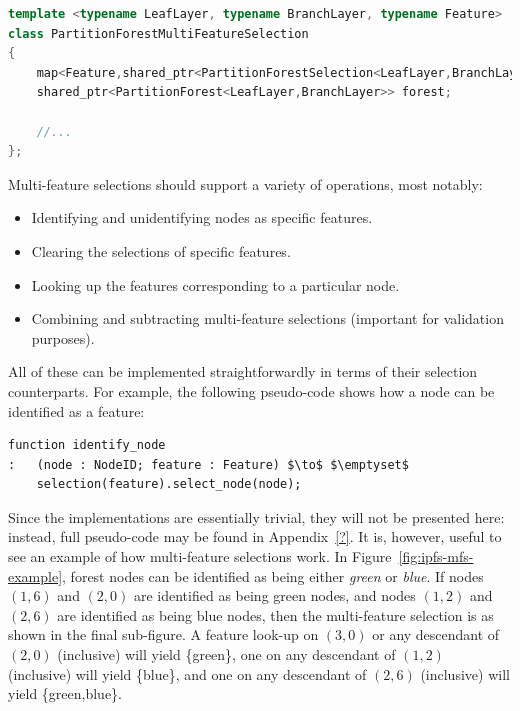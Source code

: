 \begin{lstlisting}[style=Default,language=C++]
template <typename LeafLayer, typename BranchLayer, typename Feature>
class PartitionForestMultiFeatureSelection
{
	map<Feature,shared_ptr<PartitionForestSelection<LeafLayer,BranchLayer>>> selections;
	shared_ptr<PartitionForest<LeafLayer,BranchLayer>> forest;

	//...
};
\end{lstlisting}

\noindent Multi-feature selections should support a variety of operations, most notably:

\begin{itemize}
\item Identifying and unidentifying nodes as specific features.
\item Clearing the selections of specific features.
\item Looking up the features corresponding to a particular node.
\item Combining and subtracting multi-feature selections (important for validation purposes).
\end{itemize}

\newpage

\noindent All of these can be implemented straightforwardly in terms of their selection counterparts. For example, the following pseudo-code shows how a node can be identified as a feature:

\begin{lstlisting}[style=Default]
function identify_node
:	(node : NodeID; feature : Feature) $\to$ $\emptyset$
	selection(feature).select_node(node);
\end{lstlisting}

\noindent Since the implementations are essentially trivial, they will not be presented here: instead, full pseudo-code may be found in Appendix~\ref{?}. It is, however, useful to see an example of how multi-feature selections work. In Figure~\ref{fig:ipfs-mfs-example}, forest nodes can be identified as being either \emph{green} or \emph{blue}. If nodes $(1,6)$ and $(2,0)$ are identified as being green nodes, and nodes $(1,2)$ and $(2,6)$ are identified as being blue nodes, then the multi-feature selection is as shown in the final sub-figure. A feature look-up on $(3,0)$ or any descendant of $(2,0)$ (inclusive) will yield \{green\}, one on any descendant of $(1,2)$ (inclusive) will yield \{blue\}, and one on any descendant of $(2,6)$ (inclusive) will yield \{green,blue\}.

